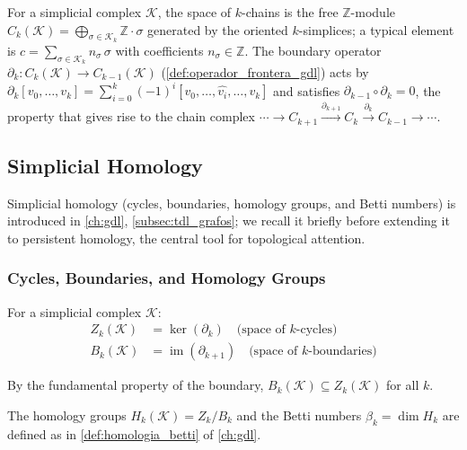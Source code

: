 \begin{definition}\label{def:espacio_cadenas}
For a simplicial complex $\mathcal{K}$, the space of $k$-chains is the free $\mathbb{Z}$-module $C_k(\mathcal{K}) = \bigoplus_{\sigma \in \mathcal{K}_k} \mathbb{Z} \cdot \sigma$ generated by the oriented $k$-simplices; a typical element is $c = \sum_{\sigma \in \mathcal{K}_k} n_{\sigma}\, \sigma$ with coefficients $n_{\sigma} \in \mathbb{Z}$. The boundary operator $\partial_k: C_k(\mathcal{K}) \to C_{k-1}(\mathcal{K})$ (\autoref{def:operador_frontera_gdl}) acts by $\partial_k[v_0, \ldots, v_k] = \sum_{i=0}^k (-1)^i [v_0, \ldots, \hat{v_i}, \ldots, v_k]$ and satisfies $\partial_{k-1} \circ \partial_k = 0$, the property that gives rise to the chain complex $\cdots \to C_{k+1} \xrightarrow{\partial_{k+1}} C_k \xrightarrow{\partial_k} C_{k-1} \to \cdots$.
\end{definition}

\subsection{Simplicial Homology}

Simplicial homology (cycles, boundaries, homology groups, and Betti numbers) is introduced in \autoref{ch:gdl}, \autoref{subsec:tdl_grafos}; we recall it briefly before extending it to persistent homology, the central tool for topological attention.

\subsubsection{Cycles, Boundaries, and Homology Groups}

\begin{definition}\label{def:ciclos_fronteras}
For a simplicial complex $\mathcal{K}$:
\begin{align}
    Z_k(\mathcal{K}) &= \ker(\partial_k) \quad \text{(space of } k\text{-cycles)} \\
    B_k(\mathcal{K}) &= \operatorname{im}(\partial_{k+1}) \quad \text{(space of } k\text{-boundaries)}
\end{align}
\end{definition}

By the fundamental property of the boundary, $B_k(\mathcal{K}) \subseteq Z_k(\mathcal{K})$ for all $k$.

The homology groups $H_k(\mathcal{K}) = Z_k/B_k$ and the Betti numbers $\beta_k = \dim H_k$ are defined as in \autoref{def:homologia_betti} of \autoref{ch:gdl}.\label{def:grupos_homologia}\label{def:numeros_betti}

